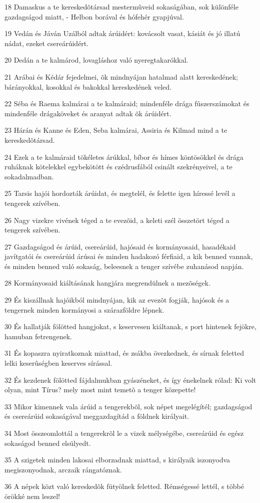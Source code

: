 \par 18 Damaskus a te kereskedõtársad mestermûveid sokaságában, sok különféle gazdagságod miatt, - Helbon borával és hófehér gyapjúval.
\par 19 Vedán és Jáván Uzálból adtak árúidért: kovácsolt vasat, kásiát és jó illatú nádat, ezeket csereárúidért.
\par 20 Dedán a te kalmárod, lovagláshoz való nyeregtakarókkal.
\par 21 Arábai és Kédár fejedelmei, õk mindnyájan hatalmad alatt kereskedének; bárányokkal, kosokkal és bakokkal kereskedének veled.
\par 22 Séba és Raema kalmárai a te kalmáraid; mindenféle drága fûszerszámokat és mindenféle drágaköveket és aranyat adtak õk árúidért.
\par 23 Hárán és Kanne és Eden, Seba kalmárai, Assiria és Kilmad mind a te kereskedõtársad.
\par 24 Ezek a te kalmáraid tökéletes árúkkal, bíbor és hímes köntösökkel és drága ruháknak kötelekkel egybekötött és czédrusfából csinált szekrényeivel, a te sokadalmadban.
\par 25 Tarsis hajói hordozták árúidat, és megtelél, és felette igen híressé levél a tengerek szívében.
\par 26 Nagy vizekre vivének téged a te evezõid, a keleti szél összetört téged a tengerek  szívében.
\par 27 Gazdagságod és árúid, csereárúid, hajósaid és kormányosaid, hasadékaid javítgatói és csereárúid árúsai és minden hadakozó férfiaid, a kik benned vannak, és minden benned való sokaság, beleesnek a tenger szívébe zuhanásod napján.
\par 28 Kormányosaid kiáltásának hangjára megrendülnek a mezõségek.
\par 29 És kiszállnak hajóikból mindnyájan, kik az evezõt fogják, hajósok és a tengernek minden kormányosi a szárazföldre lépnek.
\par 30 És hallatják fölötted hangjokat, s keservesen kiáltanak, s port hintenek fejökre, hamuban fetrengenek.
\par 31 És kopaszra nyiratkoznak miattad, és zsákba övezkednek, és sírnak feletted lelki keserûségben keserves sírással.
\par 32 És kezdenek fölötted fájdalmukban gyászéneket, és így énekelnek rólad: Ki volt olyan, mint Tírus? mely most mint temetõ a tenger közepette!
\par 33 Mikor kimennek vala árúid a tengerekbõl, sok népet megelégítél; gazdagságod és csereárúid sokaságával meggazdagítád a földnek királyait.
\par 34 Most összeomlottál a tengerekrõl le a vizek mélységébe, csereárúid és egész sokaságod benned elsülyedt.
\par 35 A szigetek minden lakosai elborzadnak miattad, s királyaik iszonyodva megiszonyodnak, arczaik rángatóznak.
\par 36 A népek közt való kereskedõk fütyölnek feletted. Rémségessé lettél, s többé örökké  nem leszel!

